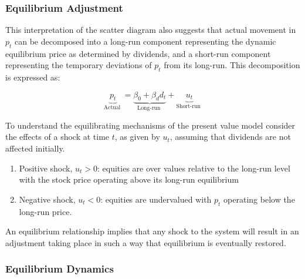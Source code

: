\documentclass[11pt]{article}
\begin{document}
\subsubsection{Equilibrium Adjustment}

This interpretation of the scatter diagram also suggests that actual movement in $p_t$ can be decomposed into a long-run component representing the dynamic equilibrium price as determined by dividends, and a short-run component representing the temporary deviations of $p_t$ from its long-run. This decomposition is expressed as:

\begin{equation}
\underbrace{p_t}_{\text {Actual }}=\underbrace{\beta_0+\beta_d d_t}_{\text {Long-run }}+\underbrace{u_t}_{\text {Short-run }}
\end{equation}

To understand the equilibrating mechanisms of the present value model consider the effects of a shock at time $t$, as given by $u_t$, assuming that dividends are not affected initially.
\begin{enumerate}
    \item Positive shock, $u_t>0$: equities are over values relative to the long-run level with the stock price operating above its long-run equilibrium
    \item Negative shock, $u_t<0$: equities are undervalued with $p_t$ operating below the long-run price.
\end{enumerate}

An equilibrium relationship implies that any shock to the system will result in an adjustment taking place in such a way that equilibrium is eventually restored.

\subsubsection{Equilibrium Dynamics}
\end{document}
